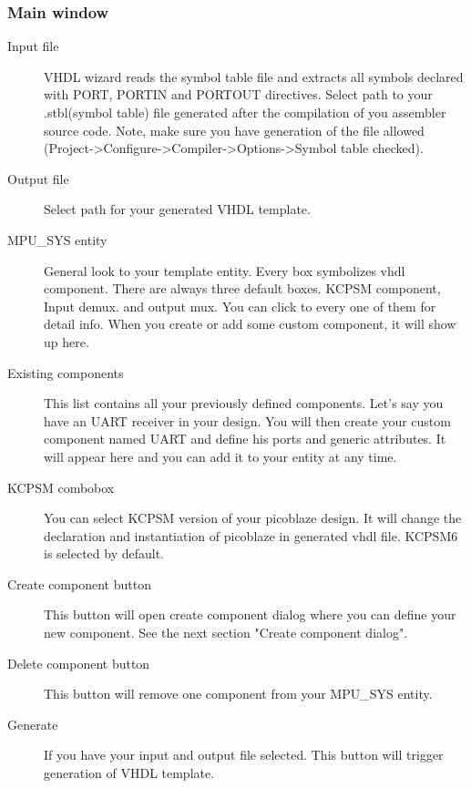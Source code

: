 \subsubsection{Main window}
    \begin{description}
        \item [Input file]
            VHDL wizard reads the symbol table file and extracts all symbols declared with PORT, PORTIN and PORTOUT directives. Select path to your .stbl(symbol table) file generated after the compilation of you assembler source code. Note, make sure you
            have generation of the file allowed (Project->Configure->Compiler->Options->Symbol table checked).
        \item [Output file]
            Select path for your generated VHDL template.
        \item [MPU\_SYS entity]
            General look to your template entity. Every box symbolizes vhdl component. There are always three default boxes. KCPSM component, Input demux.
            and output mux. You can click to every one of them for detail info. When you create or add some custom component, it will show
            up here. 
        \item [Existing components]
            This list contains all your previously defined components. Let's say you have an UART receiver in your design. You will then create your custom component named UART
            and define his ports and generic attributes. It will appear here and you can add it to your entity at any time. 
        \item [KCPSM combobox]
            You can select KCPSM version of your picoblaze design. It will change the declaration and instantiation of picoblaze in generated vhdl file. KCPSM6 is selected
            by default.
        \item [Create component button]
            This button will open create component dialog where you can define your new component. See the next section "Create component dialog".
        \item [Delete component button]
            This button will remove one component from your MPU\_SYS entity. 
        \item [Generate]
            If you have your input and output file selected. This button will trigger generation of VHDL template.
    \end{description}


